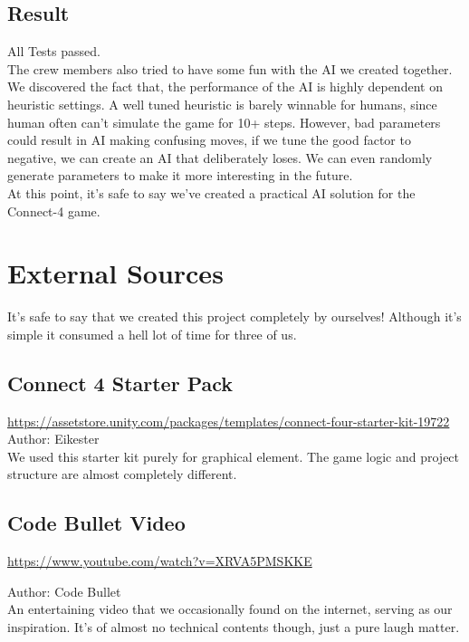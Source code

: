 \documentclass[12pt,a4paper]{article}
\begin{document}
	\subsection{Result}
	All Tests passed.\\
	
	The crew members also tried to have some fun with the AI we created together. We discovered the fact that, the performance of the AI is highly dependent on heuristic settings. A well tuned heuristic is barely winnable for humans, since human often can't simulate the game for 10+ steps. However, bad parameters could result in AI making confusing moves, if we tune the good factor to negative, we can create an AI that deliberately loses. We can even randomly generate parameters to make it more interesting in the future.\\
	
	At this point, it's safe to say we've created a practical AI solution for the Connect-4 game.
	\pagebreak
	\section{External Sources}
	It's safe to say that we created this project completely by ourselves! Although it's simple it consumed a hell lot of time for three of us.
	\subsection{Connect 4 Starter Pack}
	\url{https://assetstore.unity.com/packages/templates/connect-four-starter-kit-19722}\\
	
	Author: Eikester\\
	
	We used this starter kit purely for graphical element. The game logic and project structure are almost completely different.
	
	\subsection{Code Bullet Video}
	\url{https://www.youtube.com/watch?v=XRVA5PMSKKE}
	
	Author: Code Bullet\\
	
	An entertaining video that we occasionally found on the internet, serving as our inspiration. It's of almost no technical contents though, just a pure laugh matter.
	

	
	
\end{document}

